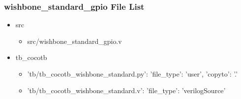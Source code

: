 \subsubsection{wishbone\_standard\_gpio File List}
\begin{itemize}
\item src
	\begin{itemize}
	\item src/wishbone\_standard\_gpio.v
	\end{itemize}
\item tb\_cocotb
	\begin{itemize}
	\item {'tb/tb\_cocotb\_wishbone\_standard.py': {'file\_type': 'user', 'copyto': '.'}}
	\item {'tb/tb\_cocotb\_wishbone\_standard.v': {'file\_type': 'verilogSource'}}
	\end{itemize}
\end{itemize}

